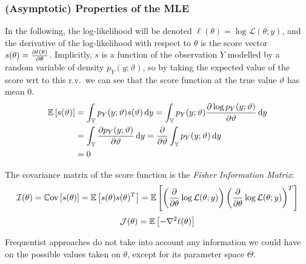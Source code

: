 \documentclass[../../Main_ManuscritThese.tex]{subfiles}
\begin{document}
\subsubsection{(Asymptotic) Properties of the MLE }
In the following, the log-likelihood will be denoted $\ell(\theta) = \log \mathcal{L}(\theta;y)$, and the derivative of the log-likelihood with respect to $\theta$ is the score vector $s(\theta) = \frac{\partial \ell(\theta)}{\partial \theta}$.
Implicitly, $s$ is a function of the observation $Y$ modelled by a random variable of density $p_Y(y;\vartheta)$, so by taking the expected value of the score wrt to this r.v.\, we can see that the score function at the true value $\vartheta$ has mean $0$.
\begin{align}
  \mathbb{E}\left[s(\vartheta)\right] &= \int_{\mathbb{Y}} p_{Y}(y ; \vartheta) s(\vartheta) \,\mathrm{d}y = \int_{\mathbb{Y}} p_{Y}(y ; \vartheta) \frac{\partial \log p_Y(y ; \vartheta)}{\partial \vartheta} \,\mathrm{d}y \\
                            & = \int_{\mathbb{Y}} \frac{\partial p_Y(y ; \vartheta)}{\partial \vartheta} \,\mathrm{d}y = \frac{\partial}{\partial \vartheta} \int_{\mathbb{Y}} p_Y(y ; \vartheta) \,\mathrm{d}y \\
                            &= 0
\end{align}

The covariance matrix of the score function is the \emph{Fisher Information Matrix}:
\begin{equation}
  \mathcal{I}(\theta) = \mathbb{C}\mathrm{ov}\left[s(\theta)\right]=  \mathbb{E}\left[s(\theta) s(\theta)^T\right] = \mathbb{E}\left[\left(\frac{\partial }{\partial \theta}\log \mathcal{L}(\theta;y)\right) \left(\frac{\partial }{\partial \theta}\log \mathcal{L}(\theta;y)\right)^T\right]
\end{equation}
\begin{equation}
  \mathcal{J}(\theta) = \mathbb{E}\left[-\nabla^2 \ell(\theta)\right]
\end{equation}

  Frequentist approaches do not take into account any information we could have on the possible values taken on $\theta$, except for its parameter space $\Theta$.
\end{document}
